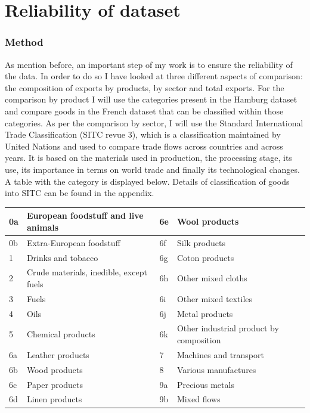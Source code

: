 \documentclass[12pt,a4paper,titlepage,english]{article}
\begin{document}
\section{Reliability of dataset}
\subsubsection{Method}
As mention before, an important step of my work is to ensure the reliability of the data. In order to do so I have looked at three different aspects of comparison: the composition of exports by products, by sector and total exports. For the comparison by product I will use the categories present in the Hamburg dataset and compare goods in the French dataset that can be classified within those categories. As per the comparison by sector, I will use the Standard International Trade Classification (SITC revue 3), which is a classification maintained by United Nations and used to compare trade flows across countries and across years. It is based on the materials used in production, the processing stage, its use, its importance in terms on world trade and finally its technological changes.  A table with the category is displayed below. Details of classification of goods into SITC can be found in the appendix.

 \label{tab:title} 
\begin{center}
\begin{tabular}{ | l | l | l | l | }
\hline
	0a & European foodstuff and live animals & 6e & Wool products \\ \hline
	0b & Extra-European foodstuff & 6f & Silk products \\ \hline
	1 & Drinks and tobacco & 6g & Coton products \\ \hline
	2 & Crude materials, inedible, except fuels & 6h & Other mixed cloths \\ \hline
	3 & Fuels & 6i & Other mixed textiles \\ \hline
	4 & Oils & 6j & Metal products \\ \hline
	5 & Chemical products & 6k & Other industrial product by composition \\ \hline
	6a & Leather products & 7 & Machines and transport \\ \hline
	6b & Wood products & 8 & Various manufactures \\ \hline
	6c & Paper products & 9a & Precious metals \\ \hline
	6d & Linen products & 9b & Mixed flows \\ \hline
\end{tabular}\\~\\
\end{center}
\end{document}
